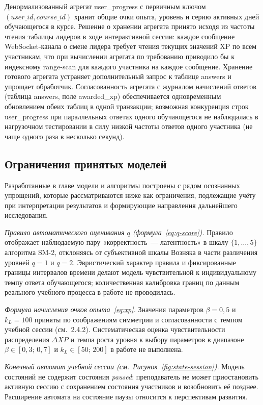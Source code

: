 Денормализованный агрегат user\_progress с первичным ключом
$(user\_id, course\_id)$ хранит общие очки опыта, уровень и серию
активных дней обучающегося в курсе. Решение о хранении агрегата
принято исходя из частоты чтения таблицы лидеров в ходе
интерактивной сессии: каждое сообщение WebSocket-канала о смене
лидера требует чтения текущих значений XP по всем участникам, что
при вычислении агрегата по требованию приводило бы к индексному
range-scan для каждого участника на каждое сообщение. Хранение
готового агрегата устраняет дополнительный запрос к таблице
answers и упрощает обработчик. Согласованность агрегата
с журналом начислений ответов (таблица answers, поле
awarded\_xp) обеспечивается одновременным обновлением
обеих таблиц в одной транзакции; возможная конкуренция строк
user\_progress при параллельных ответах одного обучающегося
не наблюдалась в нагрузочном тестировании в силу низкой частоты
ответов одного участника (не чаще одного раза в несколько секунд).

\subsection{Ограничения принятых моделей}

Разработанные в главе модели и алгоритмы построены с рядом
осознанных упрощений, которые рассматриваются ниже как
ограничения, подлежащие учёту при интерпретации результатов
и формирующие направления дальнейшего исследования.

\emph{Правило автоматического оценивания $q$ (формула~\eqref{eq:q-score}).}
Правило отображает наблюдаемую пару «корректность~--- латентность»
в шкалу $\{1, \ldots, 5\}$ алгоритма SM-2, отклоняясь
от субъективной шкалы Возняка в части различения уровней $q = 1$
и $q = 2$. Эвристический характер правила и фиксированные границы
интервалов времени делают модель чувствительной к индивидуальному
темпу ответа обучающегося; количественная калибровка границ
по данным реального учебного процесса в работе не проводилась.

\emph{Формула начисления очков опыта~\eqref{eq:xp}.} Значения
параметров $\beta = 0{,}5$ и $k_L = 100$ приняты по соображениям
симметрии и согласованности с темпом учебной сессии (см.~2.4.2).
Систематическая оценка чувствительности распределения $\Delta XP$
и темпа роста уровня к выбору параметров в диапазоне
$\beta \in [0{,}3;\,0{,}7]$ и $k_L \in [50;\,200]$ в работе
не выполнена.

\emph{Конечный автомат учебной сессии (см.~Рисунок~\ref{fig:state-session}).}
Модель состояний не содержит состояния \emph{paused}: преподаватель
не может приостановить активную сессию с сохранением состояния
участников и возобновить её позднее. Расширение автомата на состояние
паузы относится к перспективам развития.

